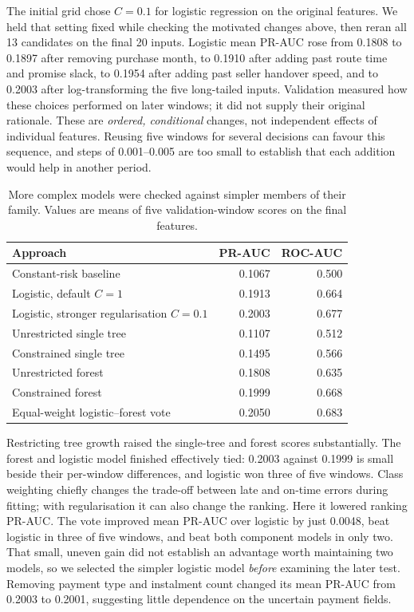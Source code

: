 \documentclass[12pt,a4paper]{article}
\begin{document}
The initial grid chose $C=0.1$ for logistic regression on the original features. We held that setting fixed while checking the motivated changes above, then reran all 13 candidates on the final 20 inputs. Logistic mean PR-AUC rose from 0.1808 to 0.1897 after removing purchase month, to 0.1910 after adding past route time and promise slack, to 0.1954 after adding past seller handover speed, and to 0.2003 after log-transforming the five long-tailed inputs. Validation measured how these choices performed on later windows; it did not supply their original rationale. These are \emph{ordered, conditional} changes, not independent effects of individual features. Reusing five windows for several decisions can favour this sequence, and steps of 0.001--0.005 are too small to establish that each addition would help in another period.

\begin{table}[h]
\centering\small
\caption{More complex models were checked against simpler members of their family. Values are means of five validation-window scores on the final features.}
\label{tab:models}
\begin{tabular}{@{}lrr@{}}
\toprule
Approach & PR-AUC & ROC-AUC \\
\midrule
Constant-risk baseline & 0.1067 & 0.500 \\
Logistic, default $C=1$ & 0.1913 & 0.664 \\
Logistic, stronger regularisation $C=0.1$ & 0.2003 & 0.677 \\
Unrestricted single tree & 0.1107 & 0.512 \\
Constrained single tree & 0.1495 & 0.566 \\
Unrestricted forest & 0.1808 & 0.635 \\
Constrained forest & 0.1999 & 0.668 \\
Equal-weight logistic--forest vote & 0.2050 & 0.683 \\
\bottomrule
\end{tabular}
\end{table}

Restricting tree growth raised the single-tree and forest scores substantially. The forest and logistic model finished effectively tied: 0.2003 against 0.1999 is small beside their per-window differences, and logistic won three of five windows. Class weighting chiefly changes the trade-off between late and on-time errors during fitting; with regularisation it can also change the ranking. Here it lowered ranking PR-AUC. The vote improved mean PR-AUC over logistic by just 0.0048, beat logistic in three of five windows, and beat both component models in only two. That small, uneven gain did not establish an advantage worth maintaining two models, so we selected the simpler logistic model \emph{before} examining the later test. Removing payment type and instalment count changed its mean PR-AUC from 0.2003 to 0.2001, suggesting little dependence on the uncertain payment fields.
\end{document}
